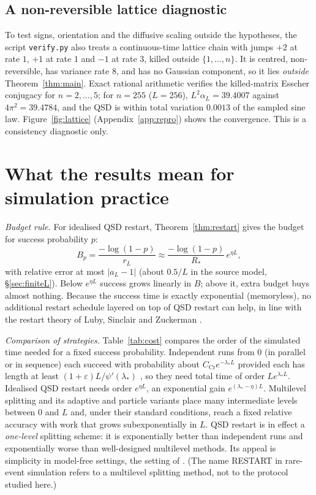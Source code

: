 \documentclass[11pt,a4paper]{article}
\theoremstyle{definition}
\theoremstyle{remark}
\newcommand{\1}{\mathbf 1}
\begin{document}
\subsection{A non-reversible lattice diagnostic}
To test signs, orientation and the diffusive scaling outside the hypotheses, the script \texttt{verify.py} also treats a continuous-time lattice chain with jumps $+2$ at rate $1$, $+1$ at rate $1$ and $-1$ at rate $3$, killed outside $\{1,\ldots,n\}$. It is centred, non-reversible, has variance rate $8$, and has no Gaussian component, so it lies \emph{outside} Theorem~\ref{thm:main}. Exact rational arithmetic verifies the killed-matrix Esscher conjugacy for $n=2,\ldots,5$; for $n=255$ ($L=256$), $L^2\alpha_L=39.4007$ against $4\pi^2=39.4784$, and the QSD is within total variation $0.0013$ of the sampled sine law. Figure~\ref{fig:lattice} (Appendix~\ref{app:repro}) shows the convergence. This is a consistency diagnostic only.

\section{What the results mean for simulation practice}\label{sec:practice}
\emph{Budget rule.} For idealised QSD restart, Theorem~\ref{thm:restart} gives the budget for success probability $p$:
\begin{equation}\label{eq:budget-rule}
 B_p=\frac{-\log(1-p)}{r_L}\approx\frac{-\log(1-p)}{R_*}\,e^{\eta L},
\end{equation}
with relative error at most $|a_L-1|$ (about $0.5/L$ in the source model, \S\ref{sec:finiteL}). Below $e^{\eta L}$ success grows linearly in $B$; above it, extra budget buys almost nothing. Because the success time is exactly exponential (memoryless), no additional restart schedule layered on top of QSD restart can help, in line with the restart theory of Luby, Sinclair and Zuckerman \cite{lsz}.

\emph{Comparison of strategies.} Table~\ref{tab:cost} compares the order of the simulated time needed for a fixed success probability. Independent runs from $0$ (in parallel or in sequence) each succeed with probability about $C_{\mathrm{Cr}}e^{-\lambda_*L}$ provided each has length at least $(1+\varepsilon)L/\psi'(\lambda_*)$ \cite{garcia}, so they need total time of order $Le^{\lambda_*L}$. Idealised QSD restart needs order $e^{\eta L}$, an exponential gain $e^{(\lambda_*-\eta)L}$. Multilevel splitting and its adaptive and particle variants \cite{villen,ghsz,cerougu,cdgr,aldousvaz} place many intermediate levels between $0$ and $L$ and, under their standard conditions, reach a fixed relative accuracy with work that grows subexponentially in $L$. QSD restart is in effect a \emph{one-level} splitting scheme: it is exponentially better than independent runs and exponentially worse than well-designed multilevel methods. Its appeal is simplicity in model-free settings, the setting of \cite{garcia}. (The name RESTART in rare-event simulation \cite{villen} refers to a multilevel splitting method, not to the protocol studied here.)
\end{document}
